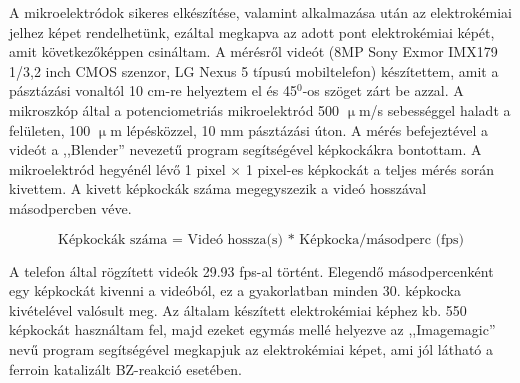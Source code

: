 A mikroelektródok sikeres elkészítése, valamint alkalmazása után az elektrokémiai jelhez képet rendelhetünk, ezáltal megkapva az adott pont elektrokémiai képét, amit következőképpen csináltam. A mérésről videót (8MP Sony Exmor IMX179 1/3,2 inch CMOS szenzor, LG Nexus 5 típusú mobiltelefon) készítettem, amit a pásztázási vonaltól 10 cm-re helyeztem el és 45$^0$-os szöget zárt be azzal. A mikroszkóp által a potenciometriás mikroelektród 500 $\upmu$m/s sebességgel haladt a felületen, 100 $\upmu$m lépésközzel, 10 mm pásztázási úton. A mérés befejeztével a videót a ,,Blender'' \cite{blender} nevezetű program segítségével képkockákra bontottam. A mikroelektród hegyénél lévő 1 pixel $\times$ 1 pixel-es képkockát a teljes mérés során kivettem. A kivett képkockák száma megegyszezik a videó hosszával másodpercben véve.

\begin{equation} 
\textrm{Képkockák száma = Videó hossza(s) * Képkocka/másodperc (fps)}
\end{equation}

A telefon által rögzített videók 29.93 fps-al történt. Elegendő másodpercenként egy képkockát kivenni a videóból, ez a gyakorlatban minden 30. képkocka kivételével valósult meg.
Az általam készített elektrokémiai képhez kb. 550 képkockát használtam fel, majd ezeket egymás mellé helyezve az ,,Imagemagic'' \cite{imagemagick} nevű program segítségével megkapjuk az elektrokémiai képet, ami jól látható a ferroin katalizált BZ-reakció esetében.  
